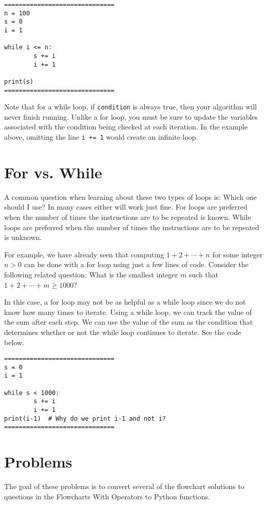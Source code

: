 \documentclass{ximera}
\begin{document}
\begin{verbatim}
==============================
n = 100
s = 0
i = 1

while i <= n:
        s += i
        i += 1

print(s)
==============================
\end{verbatim}

Note that for a while loop, if \verb|condition| is always true, then your algorithm will never finish running. Unlike a for loop, you must be sure to update the variables associated with the condition being checked at each iteration. In the example above, omitting the line \verb|i += 1| would create an infinite loop.

\section{For vs. While}

A common question when learning about these two types of loops is: Which one should I use? In many cases either will work just fine. For loops are preferred when the number of times the instructions are to be repeated is known. While loops are preferred when the number of times the instructions are to be repeated is unknown.

For example, we have already seen that computing $1+2+\cdots+n$ for some integer $n>0$ can be done with a for loop using just a few lines of code. Consider the following related question: What is the smallest integer $m$ such that $1+2+\cdots+m\geq 1000$?

In this case, a for loop may not be as helpful as a while loop since we do not know how many times to iterate. Using a while loop, we can track the value of the sum after each step. We can use the value of the sum as the condition that determines whether or not the while loop continues to iterate. See the code below.

\begin{verbatim}
==============================
s = 0
i = 1

while s < 1000:
        s += i
        i += 1
print(i-1)  # Why do we print i-1 and not i?
==============================
\end{verbatim}

\section{Problems}

The goal of these problems is to convert several of the flowchart solutions to questions in the Flowcharts With Operators to Python functions.
\end{document}
